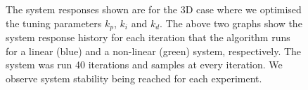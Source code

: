 \documentclass[conference]{IEEEtran}
\theoremstyle{definition}
\begin{document}
\begin{figure}[h]
    \caption{The system responses shown are for the 3D case where we optimised the tuning parameters $k_p$, $k_i$ and $k_d$. The above two graphs show the system response history for each iteration that the algorithm runs for a linear (blue) and a non-linear (green) system, respectively. The system was run 40 iterations and samples at every  iteration. We observe system stability being reached for each experiment.}
    \label{kpkikd}
\end{figure}
\vspace{-5mm}
\begin{figure}[h]
    \caption{\lipsum[2]}
    \label{mimo_smooth}
\end{figure}
\vspace{-5mm}
\begin{figure}[h]
    \caption{\lipsum[2]}
    \label{mimo_rough}
\end{figure}
\vspace{-5mm}
\begin{figure}[h]
    \caption{\lipsum[2]}
    \label{3D_plots}
\end{figure}
\end{document}
